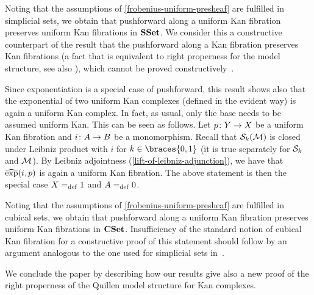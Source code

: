 \documentclass[reqno,10pt,a4paper,oneside,draft]{amsart}
\begin{document}
\begin{example}
Noting that the assumptions of \cref{frobenius-uniform-presheaf} are fulfilled in simplicial sets, we obtain that pushforward along a uniform Kan fibration preserves uniform Kan fibrations in $\SSet$.
We consider this a constructive counterpart of the result that the pushforward along a Kan fibration preserves Kan fibrations (a fact that is equivalent to right properness for the model structure, see also \cite[Lemma 4.3.1]{voevodsky-simplicial-model}), which cannot be proved constructively~\cite{coquand-non-constructivity-kan}.

Since exponentiation is a special case of pushforward, this result shows also that the exponential of two uniform Kan complexes (defined in the evident way) is again a uniform Kan complex.
In fact, as usual, only the base needs to be assumed uniform Kan.
This can be seen as follows.
Let $p \co Y \to X$ be a uniform Kan fibration and $i \co A \to B$ be a monomorphism.
Recall that $\cal{S}_k(\cal{M})$ is closed under Leibniz product with $i$ for $k \in \braces{0, 1}$ (it is true separately for $\cal{S}_k$ and $\cal{M}$).
By Leibniz adjointness (\cref{lift-of-leibniz-adjunction}), we have that $\hatexp(i, p)$ is again a uniform Kan fibration.
The above statement is then the special case $X \defeq 1$ and $A \defeq 0$.
\end{example}

\begin{example}
Noting that the assumptions of \cref{frobenius-uniform-presheaf} are fulfilled in cubical sets, we obtain that pushforward along a uniform Kan fibration preserves uniform Kan fibrations in $\CSet$.
Insufficiency of the standard notion of cubical Kan fibration for a constructive proof of this statement should follow by an argument analogous to the one used for simplicial sets in~\cite{coquand-non-constructivity-kan}.
\end{example}

We conclude the paper by describing how our results give also a new proof of the right properness of the Quillen model structure for Kan complexes.
\end{document}
